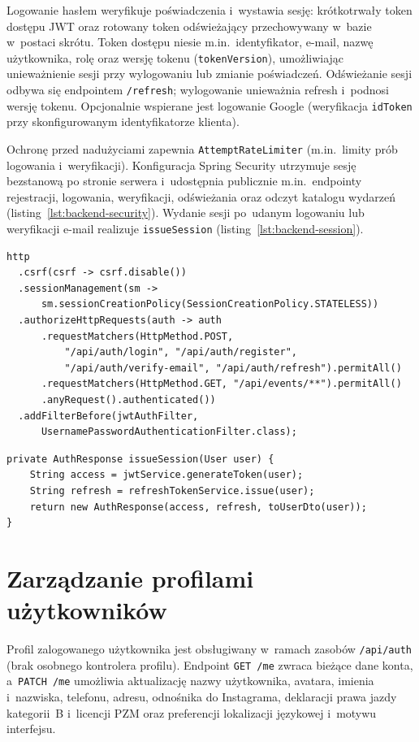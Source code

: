 \documentclass{sprz}
\begin{document}
Logowanie hasłem weryfikuje poświadczenia i~wystawia sesję: krótkotrwały token dostępu JWT oraz rotowany token odświeżający przechowywany w~bazie w~postaci skrótu. Token dostępu niesie m.in.\ identyfikator, e-mail, nazwę użytkownika, rolę oraz wersję tokenu (\texttt{tokenVersion}), umożliwiając unieważnienie sesji przy wylogowaniu lub zmianie poświadczeń. Odświeżanie sesji odbywa się endpointem \texttt{/refresh}; wylogowanie unieważnia refresh i~podnosi wersję tokenu. Opcjonalnie wspierane jest logowanie Google (weryfikacja \texttt{idToken} przy skonfigurowanym identyfikatorze klienta).

Ochronę przed nadużyciami zapewnia \texttt{AttemptRateLimiter} (m.in.\ limity prób logowania i~weryfikacji). Konfiguracja Spring Security utrzymuje sesję bezstanową po stronie serwera i~udostępnia publicznie m.in.\ endpointy rejestracji, logowania, weryfikacji, odświeżania oraz odczyt katalogu wydarzeń (listing~\ref{lst:backend-security}). Wydanie sesji po~udanym logowaniu lub weryfikacji e-mail realizuje \texttt{issueSession} (listing~\ref{lst:backend-session}).

\begin{lstlisting}[caption={Fragment \texttt{SecurityFilterChain} --- sesja bezstanowa i ścieżki publiczne},label={lst:backend-security}]
http
  .csrf(csrf -> csrf.disable())
  .sessionManagement(sm ->
      sm.sessionCreationPolicy(SessionCreationPolicy.STATELESS))
  .authorizeHttpRequests(auth -> auth
      .requestMatchers(HttpMethod.POST,
          "/api/auth/login", "/api/auth/register",
          "/api/auth/verify-email", "/api/auth/refresh").permitAll()
      .requestMatchers(HttpMethod.GET, "/api/events/**").permitAll()
      .anyRequest().authenticated())
  .addFilterBefore(jwtAuthFilter,
      UsernamePasswordAuthenticationFilter.class);
\end{lstlisting}

\begin{lstlisting}[caption={Wydanie sesji: JWT access + rotowany refresh},label={lst:backend-session}]
private AuthResponse issueSession(User user) {
    String access = jwtService.generateToken(user);
    String refresh = refreshTokenService.issue(user);
    return new AuthResponse(access, refresh, toUserDto(user));
}
\end{lstlisting}

\section{Zarządzanie profilami użytkowników}
Profil zalogowanego użytkownika jest obsługiwany w~ramach zasobów \texttt{/api/auth} (brak osobnego kontrolera profilu). Endpoint \texttt{GET /me} zwraca bieżące dane konta, a~\texttt{PATCH /me} umożliwia aktualizację nazwy użytkownika, avatara, imienia i~nazwiska, telefonu, adresu, odnośnika do Instagrama, deklaracji prawa jazdy kategorii~B i~licencji PZM oraz preferencji lokalizacji językowej i~motywu interfejsu.
\end{document}
